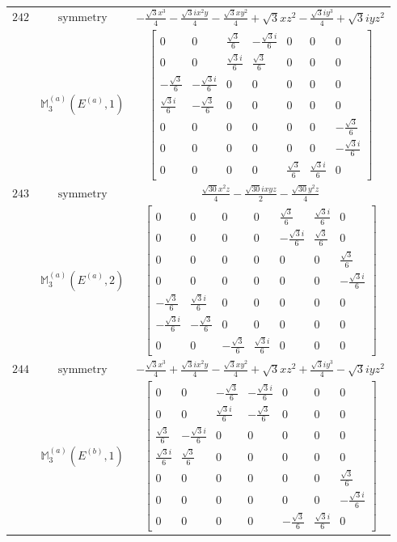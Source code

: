 \documentclass[fleqn,8pt,landscape]{jsarticle}
\begin{document}
\begin{longtable}{ccc}
$ 242 $ & $ \text{symmetry} $ & $ - \frac{\sqrt{3} x^{3}}{4} - \frac{\sqrt{3} i x^{2} y}{4} - \frac{\sqrt{3} x y^{2}}{4} + \sqrt{3} x z^{2} - \frac{\sqrt{3} i y^{3}}{4} + \sqrt{3} i y z^{2} $ \\
$  $ & $ \mathbb{M}_{3}^{(a)}(E^{(a)},1) $ & $ \begin{bmatrix} 0 & 0 & \frac{\sqrt{3}}{6} & - \frac{\sqrt{3} i}{6} & 0 & 0 & 0 \\ 0 & 0 & \frac{\sqrt{3} i}{6} & \frac{\sqrt{3}}{6} & 0 & 0 & 0 \\ - \frac{\sqrt{3}}{6} & - \frac{\sqrt{3} i}{6} & 0 & 0 & 0 & 0 & 0 \\ \frac{\sqrt{3} i}{6} & - \frac{\sqrt{3}}{6} & 0 & 0 & 0 & 0 & 0 \\ 0 & 0 & 0 & 0 & 0 & 0 & - \frac{\sqrt{3}}{6} \\ 0 & 0 & 0 & 0 & 0 & 0 & - \frac{\sqrt{3} i}{6} \\ 0 & 0 & 0 & 0 & \frac{\sqrt{3}}{6} & \frac{\sqrt{3} i}{6} & 0 \end{bmatrix} $ \\ \hline
$ 243 $ & $ \text{symmetry} $ & $ \frac{\sqrt{30} x^{2} z}{4} - \frac{\sqrt{30} i x y z}{2} - \frac{\sqrt{30} y^{2} z}{4} $ \\
$  $ & $ \mathbb{M}_{3}^{(a)}(E^{(a)},2) $ & $ \begin{bmatrix} 0 & 0 & 0 & 0 & \frac{\sqrt{3}}{6} & \frac{\sqrt{3} i}{6} & 0 \\ 0 & 0 & 0 & 0 & - \frac{\sqrt{3} i}{6} & \frac{\sqrt{3}}{6} & 0 \\ 0 & 0 & 0 & 0 & 0 & 0 & \frac{\sqrt{3}}{6} \\ 0 & 0 & 0 & 0 & 0 & 0 & - \frac{\sqrt{3} i}{6} \\ - \frac{\sqrt{3}}{6} & \frac{\sqrt{3} i}{6} & 0 & 0 & 0 & 0 & 0 \\ - \frac{\sqrt{3} i}{6} & - \frac{\sqrt{3}}{6} & 0 & 0 & 0 & 0 & 0 \\ 0 & 0 & - \frac{\sqrt{3}}{6} & \frac{\sqrt{3} i}{6} & 0 & 0 & 0 \end{bmatrix} $ \\ \hline
$ 244 $ & $ \text{symmetry} $ & $ - \frac{\sqrt{3} x^{3}}{4} + \frac{\sqrt{3} i x^{2} y}{4} - \frac{\sqrt{3} x y^{2}}{4} + \sqrt{3} x z^{2} + \frac{\sqrt{3} i y^{3}}{4} - \sqrt{3} i y z^{2} $ \\
$  $ & $ \mathbb{M}_{3}^{(a)}(E^{(b)},1) $ & $ \begin{bmatrix} 0 & 0 & - \frac{\sqrt{3}}{6} & - \frac{\sqrt{3} i}{6} & 0 & 0 & 0 \\ 0 & 0 & \frac{\sqrt{3} i}{6} & - \frac{\sqrt{3}}{6} & 0 & 0 & 0 \\ \frac{\sqrt{3}}{6} & - \frac{\sqrt{3} i}{6} & 0 & 0 & 0 & 0 & 0 \\ \frac{\sqrt{3} i}{6} & \frac{\sqrt{3}}{6} & 0 & 0 & 0 & 0 & 0 \\ 0 & 0 & 0 & 0 & 0 & 0 & \frac{\sqrt{3}}{6} \\ 0 & 0 & 0 & 0 & 0 & 0 & - \frac{\sqrt{3} i}{6} \\ 0 & 0 & 0 & 0 & - \frac{\sqrt{3}}{6} & \frac{\sqrt{3} i}{6} & 0 \end{bmatrix} $ \\ \hline

\end{longtable}
\end{document}
